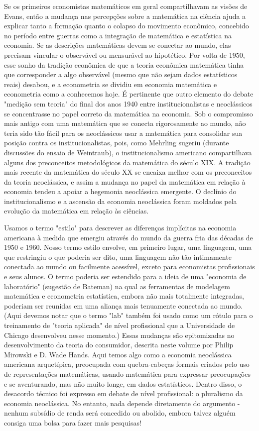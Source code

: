 \documentclass[12pt]{article}
\begin{document}
Se os primeiros economistas matemáticos em geral compartilhavam as visões de Evans, então a mudança nas percepções sobre a matemática na ciência ajuda a explicar tanto a formação quanto o colapso do movimento econômico, concebido no período entre guerras como a integração de matemática e estatística na economia. Se as descrições matemáticas devem se conectar ao mundo, elas precisam vincular o observável ou mensurável ao hipotético. Por volta de 1950, esse sonho da tradição econômica de que a teoria econômica matemática tinha que corresponder a algo observável (mesmo que não sejam dados estatísticos reais) desabou, e a econometria se dividiu em economia matemática e econometria como a conhecemos hoje. É pertinente que outro elemento do debate "medição sem teoria" do final dos anos 1940 entre institucionalistas e neoclássicos se concentrasse no papel correto da matemática na economia. Sob o compromisso mais antigo com uma matemática que se conecta rigorosamente ao mundo, não teria sido tão fácil para os neoclássicos usar a matemática para consolidar sua posição contra os institucionalistas, pois, como Mehrling sugeriu (durante discussões do ensaio de Weintraub), o institucionalismo americano compartilhava alguns dos preconceitos metodológicos da matemática do século XIX. A tradição mais recente da matemática do século XX se encaixa melhor com os preconceitos da teoria neoclássica, e assim a mudança no papel da matemática em relação à economia tendeu a apoiar a hegemonia neoclássica emergente. O declínio do institucionalismo e a ascensão da economia neoclássica foram moldados pela evolução da matemática em relação às ciências.

Usamos o termo "estilo" para descrever as diferenças implícitas na economia americana à medida que emergiu através do mundo da guerra fria das décadas de 1950 e 1960. Nosso termo estilo envolve, em primeiro lugar, uma linguagem, uma que restringiu o que poderia ser dito, uma linguagem não tão intimamente conectada ao mundo ou facilmente acessível, exceto para economistas profissionais e seus alunos. O termo poderia ser estendido para a ideia de uma "economia de laboratório" (sugestão de Bateman) na qual as ferramentas de modelagem matemática e econometria estatística, embora não mais totalmente integradas, poderiam ser reunidas em uma aliança mais tenuamente conectada ao mundo. (Aqui devemos notar que o termo "lab" também foi usado como um rótulo para o treinamento de "teoria aplicada" de nível profissional que a Universidade de Chicago desenvolveu nesse momento.) Essas mudanças são epitomizadas no desenvolvimento da teoria do consumidor, descrita neste volume por Philip Mirowski e D. Wade Hands. Aqui temos algo como a economia neoclássica americana arquetípica, preocupada com quebra-cabeças formais criados pelo uso de representações matemáticas, usando matemática para expressar preocupações e se aventurando, mas não muito longe, em dados estatísticos. Dentro disso, o desacordo técnico foi expresso em debate de nível profissional: o pluralismo da economia neoclássica. No entanto, nada depende diretamente do argumento - nenhum subsídio de renda será concedido ou abolido, embora talvez alguém consiga uma bolsa para fazer mais pesquisas!
\end{document}
